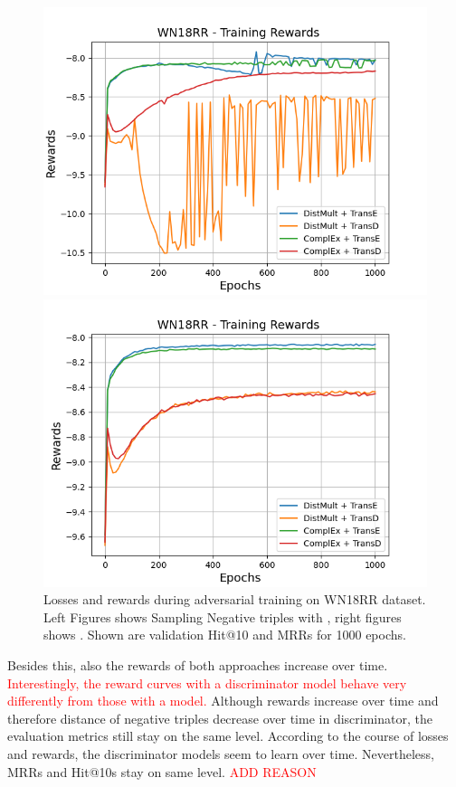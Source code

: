 \begin{figure}
\begin{minipage}{.5\textwidth}
      \includegraphics[width=0.9\linewidth]{figures/results/gan_train/not_pretrained/uncertainty/max/entropy/wn18rr/1k_epochs/uncertainty_wn18rr_rew.png}
    \end{minipage}%
    \begin{minipage}{.5\textwidth}
      \centering
      \includegraphics[width=0.9\linewidth]{figures/results/gan_train/not_pretrained/uncertainty/max_distribution/entropy/wn18rr/1k_epochs/uncertainty_wn18rr_rew.png}
    \end{minipage}%
    \caption{Losses and rewards during adversarial training on \textsc{WN18RR} dataset. 
    Left Figures shows Sampling Negative triples with \usmax, right figures shows \ussoftmax.
    Shown are validation Hit@10 and MRRs for 1000 epochs.}
    \label{fig:advtrain_wn18rr_usmax_ussoftmax_losses_rewards}
\end{figure}
Besides this, also the rewards of both approaches increase over time.
\textcolor{red}{Interestingly, the reward curves with a \transd discriminator model behave very differently from those with a \transe model.}
Although rewards increase over time and therefore distance of negative triples decrease over time in discriminator, the evaluation metrics still stay on the same level.
According to the course of losses and rewards, the discriminator models seem to learn over time.
Nevertheless, MRRs and Hit@10s stay on same level.
\textcolor{red}{ADD REASON}


